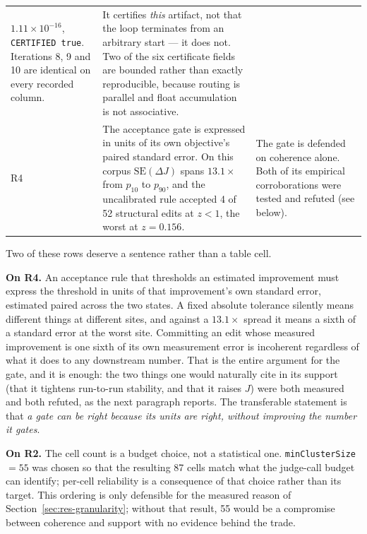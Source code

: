 \begin{table}[htbp]
\begin{tabular}{p{0.7cm}p{5.6cm}p{5.8cm}}
$1.11\times10^{-16}$, \texttt{CERTIFIED true}. Iterations 8, 9 and 10
are identical on every recorded column.
& It certifies \emph{this} artifact, not that the loop terminates from
an arbitrary start --- it does not. Two of the six certificate fields
are bounded rather than exactly reproducible, because routing is
parallel and float accumulation is not associative. \\
\addlinespace
R4
& The acceptance gate is expressed in units of its own objective's
paired standard error. On this corpus $\mathrm{SE}(\Delta J)$ spans
$13.1\times$ from $p_{10}$ to $p_{90}$, and the uncalibrated rule
accepted 4 of 52 structural edits at $z < 1$, the worst at $z = 0.156$.
& The gate is defended on coherence alone. Both of its empirical
corroborations were tested and refuted (see below). \\
\bottomrule
\end{tabular}
\end{table}

Two of these rows deserve a sentence rather than a table cell.

\textbf{On R4.} An acceptance rule that thresholds an estimated
improvement must express the threshold in units of that improvement's
own standard error, estimated paired across the two states. A fixed
absolute tolerance silently means different things at different sites,
and against a $13.1\times$ spread it means a sixth of a standard error
at the worst site. Committing an edit whose measured improvement is one
sixth of its own measurement error is incoherent regardless of what it
does to any downstream number. That is the entire argument for the
gate, and it is enough: the two things one would naturally cite in its
support (that it tightens run-to-run stability, and that it raises
$J$) were both measured and both refuted, as the next paragraph
reports. The transferable statement is that \emph{a gate can be right
because its units are right, without improving the number it gates}.

\textbf{On R2.} The cell count is a budget choice, not a statistical
one. \texttt{minClusterSize} $= 55$ was chosen so that the resulting
87 cells match what the judge-call budget can identify; per-cell
reliability is a consequence of that choice rather than its target.
This ordering is only defensible for the measured reason of
Section~\ref{sec:res-granularity}; without that result, 55 would be a
compromise between coherence and support with no evidence behind the
trade.

